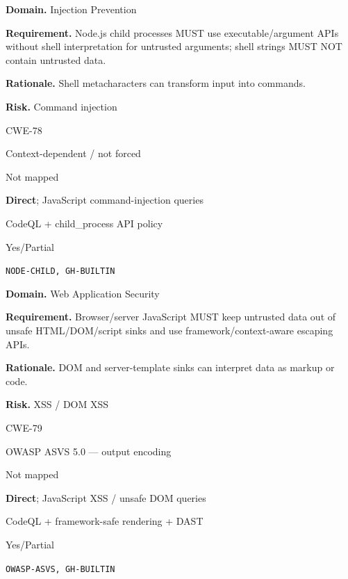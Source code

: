 \documentclass[10pt,letterpaper]{article}
\newcommand{\prioritybadge}[2]{\tcbox[on line,boxrule=0pt,arc=1.2mm,boxsep=0.7mm,left=1mm,right=1mm,top=0.4mm,bottom=0.4mm,colback=#2!12,coltext=#2]{\scriptsize\bfseries #1}}
\begin{document}
\begin{rulebox}[title={\texttt{SCS-JS-INJ-001} \hfill \prioritybadge{Critical Control}{Critical}}]
\textbf{Domain.} Injection Prevention

\textbf{Requirement.} Node.js child processes MUST use executable/argument APIs without shell interpretation for untrusted arguments; shell strings MUST NOT contain untrusted data.

\textbf{Rationale.} Shell metacharacters can transform input into commands.

\textbf{Risk.} Command injection

\begin{description}[leftmargin=2.65cm,labelwidth=2.3cm,style=nextline,itemsep=1pt,topsep=3pt]
  \item[CWE] CWE-78
  \item[OWASP] Context-dependent / not forced
  \item[CERT] Not mapped
  \item[CodeQL] \textbf{Direct}; JavaScript command-injection queries
  \item[Enforcement] CodeQL + child\_process API policy
  \item[Automation] Yes/Partial
  \item[Sources] \texttt{NODE-CHILD, GH-BUILTIN}
\end{description}
\end{rulebox}

\begin{rulebox}[title={\texttt{SCS-JS-WEB-001} \hfill \prioritybadge{Critical Control}{Critical}}]
\textbf{Domain.} Web Application Security

\textbf{Requirement.} Browser/server JavaScript MUST keep untrusted data out of unsafe HTML/DOM/script sinks and use framework/context-aware escaping APIs.

\textbf{Rationale.} DOM and server-template sinks can interpret data as markup or code.

\textbf{Risk.} XSS / DOM XSS

\begin{description}[leftmargin=2.65cm,labelwidth=2.3cm,style=nextline,itemsep=1pt,topsep=3pt]
  \item[CWE] CWE-79
  \item[OWASP] OWASP ASVS 5.0 --- output encoding
  \item[CERT] Not mapped
  \item[CodeQL] \textbf{Direct}; JavaScript XSS / unsafe DOM queries
  \item[Enforcement] CodeQL + framework-safe rendering + DAST
  \item[Automation] Yes/Partial
  \item[Sources] \texttt{OWASP-ASVS, GH-BUILTIN}
\end{description}
\end{rulebox}
\end{document}
